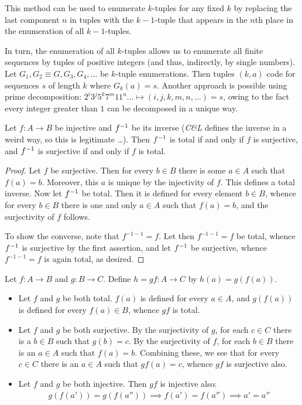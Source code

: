 This method can be used to enumerate $k$-tuples for any fixed $k$ by replacing the last component $n$ in tuples with the $k-1$-tuple that appears in the $n$th place in the enumeration of all $k-1$-tuples.

In turn, the enumeration of all $k$-tuples allows us to enumerate all finite sequences by tuples of positive integers (and thus, indirectly, by single numbers).
Let $G_1, G_2 \equiv G, G_3, G_4, \ldots$ be $k$-tuple enumerations.
Then tuples $(k, a)$ code for sequences $s$ of length $k$ where $G_k(a) = s$.
Another approach is possible using prime decomposition: $2^i3^j5^k7^m11^n\ldots \mapsto (i,j,k,m,n,\ldots) = s$, owing to the fact every integer greater than $1$ can be decomposed in a unique way.

\begin{exercise}[1.1]
  Let $f\colon A \to B$ be injective and $f^{-1}$ be its inverse (\emph{C\&L} defines the inverse in a weird way, so this is legitimate \ldots).
  Then $f^{-1}$ is total if and only if $f$ is surjective, and $f^{-1}$ is surjective if and only if $f$ is total.
\end{exercise}
\begin{proof}
  Let $f$ be surjective.
  Then for every $b \in B$ there is some $a \in A$ such that $f(a) = b$.
  Moreover, this $a$ is unique by the injectivity of $f$.
  This defines a total inverse.
  Now let $f^{-1}$ be total.
  Then it is defined for every element $b \in B$, whence for every $b \in B$ there is one and only $a \in A$ such that $f(a) = b$, and the surjectivity of $f$ follows.

  To show the converse, note that $f^{-1-1} = f$.
  Let then $f^{-1-1} = f$ be total, whence $f^{-1}$ is surjective by the first assertion, and let $f^{-1}$ be surjective, whence $f^{-1-1} = f$ is again total, as desired.
\end{proof}

\begin{exercise}[1.2]
  Let $f\colon A \to B$ and $g\colon B\to C$.
  Define $h = gf \colon A \to C$ by $h(a) = g(f(a))$.
  \begin{itemize}
    \item Let $f$ and $g$ be both total.
    $f(a)$ is defined for every $a \in A$, and $g(f(a))$ is defined for every $f(a) \in B$, whence $gf$ is total.
    \item Let $f$ and $g$ be both surjective.
    By the surjectivity of $g$, for each $c \in C$ there is a $b \in B$ such that $g(b) = c$.
    By the surjectivity of $f$, for each $b \in B$ there is an $a \in A$ such that $f(a) = b$.
    Combining these, we see that for every $c \in C$ there is an $a \in A$ such that $gf(a) = c$, whence $gf$ is surjective also.
    \item Let $f$ and $g$ be both injective.
    Then $gf$ is injective also:
    \begin{align*}
      g(f(a')) = g(f(a'')) \implies f(a') = f(a'') \implies a' = a''
    \end{align*}
  \end{itemize}
\end{exercise}

